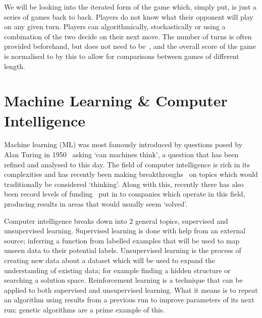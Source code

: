 We will be looking into the iterated form of the game which, simply put, is just a series of games back to back. 
Players do not know what their opponent will play on any given turn.
Players can algorithmically, stochastically or using a combination of the two decide on their next move.
The number of turns is often provided beforehand, but does not need to be~\cite{axelrod1980more}, and the overall score of the game is normalised to by this to allow for comparisons between games of different length.

\section{Machine Learning \& Computer Intelligence}\label{sec:machineLearningAndcomputerIntelligence}
Machine learning (ML) was most famously introduced by questions posed by Alan Turing in 1950~\cite{turing1950computing} asking `can machines think', a question that has been refined and analysed to this day.
The field of computer intelligence is rich in its complexities and has recently been making breakthroughs~\cite{knight2017alphaZeroMIT} on topics which would traditionally be considered `thinking'.
Along with this, recently there has also been record levels of funding~\cite{chui2017artificial} put in to companies which operate in this field, producing results in areas that would usually seem `solved'.

Computer intelligence breaks down into 2 general topics, supervised and unsupervised learning.
Supervised learning is done with help from an external source; inferring a function from labelled examples that will be used to map unseen data to their potential labels.
Unsupervised learning is the process of creating new data about a dataset which will be used to expand the understanding of existing data; for example finding a hidden structure or searching a solution space.
Reinforcement learning is a technique that can be applied to both supervised and unsupervised learning.
What it means is to repeat an algorithm using results from a previous run to improve parameters of its next run; genetic algorithms are a prime example of this.

